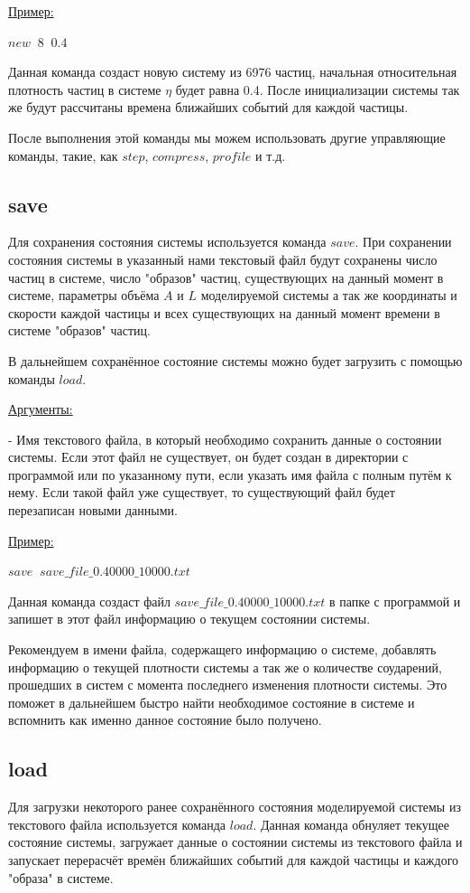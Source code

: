 \documentclass{article}
\begin{document}
\uline{Пример:}

$ new \;\; 8 \;\; 0.4 $

Данная команда создаст новую систему из 6976 частиц, начальная относительная плотность частиц в системе $ \eta $ будет равна 0.4. После инициализации системы так же будут рассчитаны времена ближайших событий для каждой частицы.

После выполнения этой команды мы можем использовать другие управляющие команды, такие, как $ step $, $ compress $, $ profile $ и т.д.


\subsection{save}
Для сохранения состояния системы используется команда $ save $. При сохранении состояния системы в указанный нами текстовый файл будут сохранены число частиц в системе, число "образов" частиц, существующих на данный момент в системе, параметры объёма $ A $ и $ L $ моделируемой системы а так же координаты и скорости каждой частицы и всех существующих на данный момент времени в системе "образов" частиц.

В дальнейшем сохранённое состояние системы можно будет загрузить с помощью команды $ load $.

\uline{Аргументы:}

- Имя текстового файла, в который необходимо сохранить данные о состоянии системы. Если этот файл не существует, он будет создан в директории с программой или по указанному пути, если указать имя файла с полным путём к нему. Если такой файл уже существует, то существующий файл будет перезаписан новыми данными.

\uline{Пример:}

$ save \;\; save\_file\_0.40000\_10000.txt $

Данная команда создаст файл $ save\_file\_0.40000\_10000.txt $ в папке с программой и запишет в этот файл информацию о текущем состоянии системы.

Рекомендуем в имени файла, содержащего информацию о системе, добавлять информацию о текущей плотности системы а так же о количестве соударений, прошедших в систем с момента последнего изменения плотности системы. Это поможет в дальнейшем быстро найти необходимое состояние в системе и вспомнить как именно данное состояние было получено.

\subsection{load}
Для загрузки некоторого ранее сохранённого состояния моделируемой системы из текстового файла используется команда $ load $. Данная команда обнуляет текущее состояние системы, загружает данные о состоянии системы из текстового файла и запускает перерасчёт времён ближайших событий для каждой частицы и каждого "образа" в системе.
\end{document}
